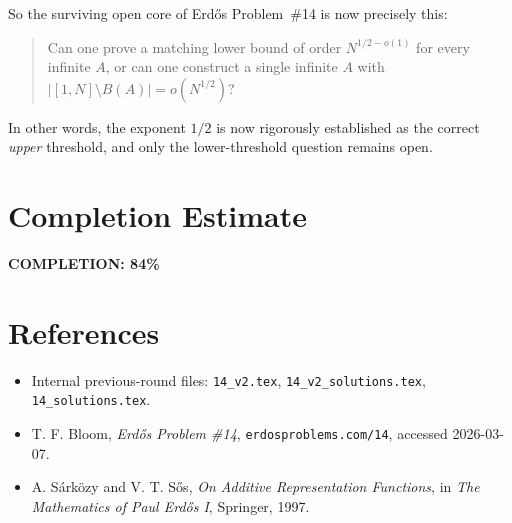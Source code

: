 So the surviving open core of Erd\H{o}s Problem~\#14 is now precisely this:
\begin{quote}
Can one prove a matching lower bound of order $N^{1/2-o(1)}$ for every infinite $A$, or can one construct a single infinite $A$ with $|[1,N]\setminus B(A)|=o(N^{1/2})$?
\end{quote}
In other words, the exponent $1/2$ is now rigorously established as the correct \emph{upper} threshold, and only the lower-threshold question remains open.

\section{Completion Estimate}
\label{sec:round5-completion}
\textbf{COMPLETION: 84\%}

\section{References}
\label{sec:round5-references}
\begin{itemize}
\item Internal previous-round files: \texttt{14\_v2.tex}, \texttt{14\_v2\_solutions.tex}, \texttt{14\_solutions.tex}.
\item T. F. Bloom, \emph{Erd\H{o}s Problem \#14}, \texttt{erdosproblems.com/14}, accessed 2026-03-07.
\item A. S\'ark\"ozy and V. T. S\H{o}s, \emph{On Additive Representation Functions}, in \emph{The Mathematics of Paul Erd\H{o}s I}, Springer, 1997.
\end{itemize}
